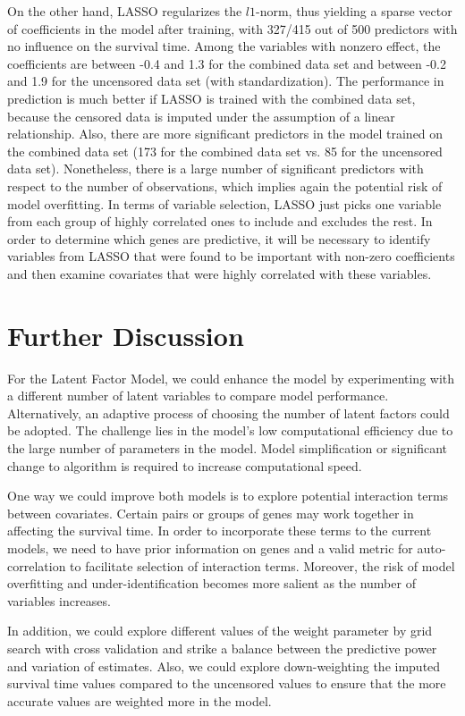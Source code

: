 \documentclass[a4paper]{article}
\begin{document}
On the other hand, LASSO regularizes the $l1$-norm, thus yielding a sparse vector of coefficients in the model after training, with 327/415 out of 500 predictors with no influence on the survival time. Among the variables with nonzero effect, the coefficients are between -0.4 and 1.3 for the combined data set and between -0.2 and 1.9 for the uncensored data set (with standardization). The performance in prediction is much better if LASSO is trained with the combined data set, because the censored data is imputed under the assumption of a linear relationship. Also, there are more significant predictors in the model trained on the combined data set (173 for the combined data set vs. 85 for the uncensored data set). Nonetheless, there is a large number of significant predictors with respect to the number of observations, which implies again the potential risk of model overfitting. In terms of variable selection, LASSO just picks one variable from each group of highly correlated ones to include and excludes the rest. In order to determine which genes are predictive, it will be necessary to identify variables from LASSO that were found to be important with non-zero coefficients and then examine covariates that were highly correlated with these variables.

\section{Further Discussion}

For the Latent Factor Model, we could enhance the model by experimenting with a different number of latent variables to compare model performance. Alternatively, an adaptive process of choosing the number of latent factors could be adopted. The challenge lies in the model's low computational efficiency due to the large number of parameters in the model. Model simplification or significant change to algorithm is required to increase computational speed.

One way we could improve both models is to explore potential interaction terms between covariates. Certain pairs or groups of genes may work together in affecting the survival time. In order to incorporate these terms to the current models, we need to have prior information on genes and a valid metric for auto-correlation to facilitate selection of interaction terms. Moreover, the risk of model overfitting and under-identification becomes more salient as the number of variables increases.

In addition, we could explore different values of the weight parameter by grid search with cross validation and strike a balance between the predictive power and variation of estimates. Also, we could explore down-weighting the imputed survival time values compared to the uncensored values to ensure that the more accurate values are weighted more in the model.
\end{document}
